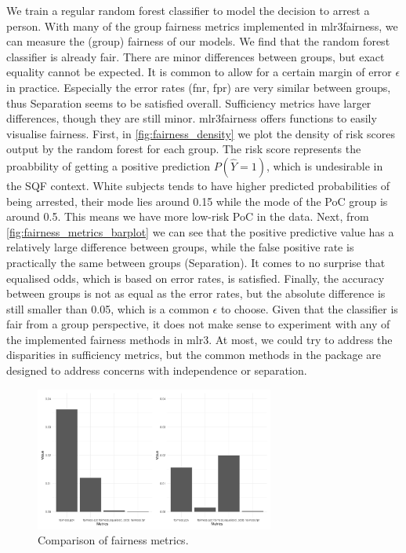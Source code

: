 We train a regular random forest classifier to model the decision to arrest a person. With many of the group fairness metrics implemented in mlr3fairness, we can measure the (group) fairness of our models.
We find that the random forest classifier is already fair. There are minor differences between groups, but exact equality cannot be expected. It is common to allow for a certain margin of error $\epsilon$ in practice.
Especially the error rates (fnr, fpr) are very similar between groups, thus Separation seems to be satisfied overall. Sufficiency metrics have larger differences, though they are still minor. mlr3fairness offers functions to easily visualise fairness. First, in \autoref{fig:fairness_density} we plot the density of risk scores output by the random forest for each group.
The risk score represents the proabbility of getting a positive prediction $P(\hat{Y} = 1)$, which is undesirable in the SQF context. White subjects tends to have higher predicted probabilities of being arrested, their mode lies around 0.15 while the mode of the PoC group is around 0.5. This means we have more low-risk PoC in the data. Next, from \autoref{fig:fairness_metrics_barplot} we can see that the positive predictive value has a relatively large difference between groups,
while the false positive rate is practically the same between groups (Separation). It comes to no surprise that equalised odds, which is based on error rates, is satisfied. Finally, the accuracy between groups is not as equal as the error rates, but the absolute difference is still smaller than 0.05, which is a common $\epsilon$ to choose.
Given that the classifier is fair from a group perspective, it does not make sense to experiment with any of the implemented fairness methods in mlr3. At most, we could try to address the disparities in sufficiency metrics, but the common methods in the package are designed to address concerns with independence or separation. \\
\begin{figure}
    \centering
    \includegraphics[width=0.7\textwidth]{../figures/sqf_case_study_plot8.png}
    \caption{Comparison of fairness metrics.}
    \label{fig:fairness_metrics_barplot}
\end{figure}

